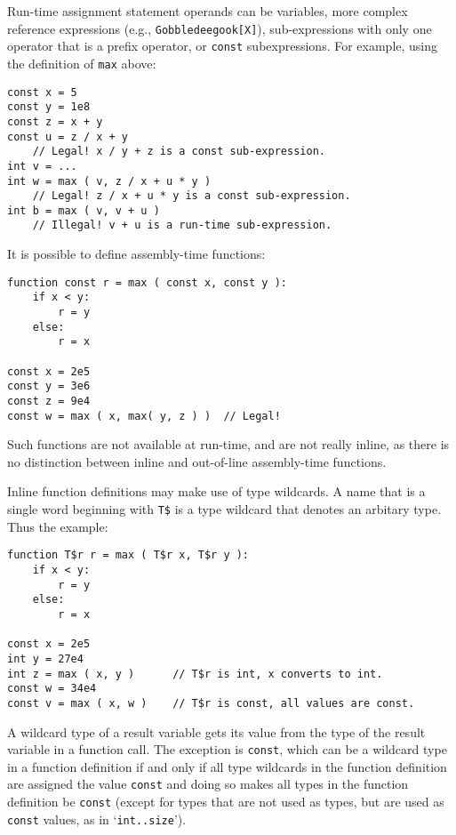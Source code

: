 \documentclass[12pt]{article}
\newenvironment{indpar}[1][0.3in]%
	{\begin{list}{}%
		     {\setlength{\itemsep}{0in}%
		      \setlength{\topsep}{0in}%
		      \setlength{\parsep}{1ex}%
		      \setlength{\labelwidth}{#1}%
		      \setlength{\leftmargin}{#1}%
		      \addtolength{\leftmargin}{\labelsep}}%
	 \item}%
	{\end{list}}
\begin{document}
Run-time assignment statement operands can be variables, more
complex reference expressions (e.g., {\tt Gobbledeegook[X]}),
sub-expressions with only one operator that is a prefix operator,
or {\tt const} subexpressions.
For example, using the definition of {\tt max} above:

\begin{indpar}\begin{verbatim}
const x = 5
const y = 1e8
const z = x + y
const u = z / x + y
    // Legal! x / y + z is a const sub-expression.
int v = ...
int w = max ( v, z / x + u * y )
    // Legal! z / x + u * y is a const sub-expression.
int b = max ( v, v + u ) 
    // Illegal! v + u is a run-time sub-expression.
\end{verbatim}\end{indpar}

It is possible to define assembly-time functions:

\begin{indpar}\begin{verbatim}
function const r = max ( const x, const y ):
    if x < y:
        r = y
    else:
        r = x

const x = 2e5
const y = 3e6
const z = 9e4
const w = max ( x, max( y, z ) )  // Legal!
\end{verbatim}\end{indpar}

Such functions are not available at run-time, and
are not really inline, as there is no
distinction between inline and out-of-line assembly-time functions.

Inline function definitions may make use of type wildcards.
A name that is a single word beginning with {\tt T\$}
is a type wildcard that denotes
an arbitary type.  Thus the example:

\begin{indpar}\begin{verbatim}
function T$r r = max ( T$r x, T$r y ):
    if x < y:
        r = y
    else:
        r = x

const x = 2e5
int y = 27e4
int z = max ( x, y )      // T$r is int, x converts to int.
const w = 34e4
const v = max ( x, w )    // T$r is const, all values are const.
\end{verbatim}\end{indpar}

A wildcard type of a result variable gets its value from the
type of the result variable in a function call.  The exception
is {\tt const}, which can be a wildcard type in a function
definition if and only if all type wildcards in the function definition
are assigned the value {\tt const} and doing so makes
all types in the function definition be {\tt const}
(except for types that are not used as types, but are used as
{\tt const} values, as in `{\tt int..size}').
\end{document}
